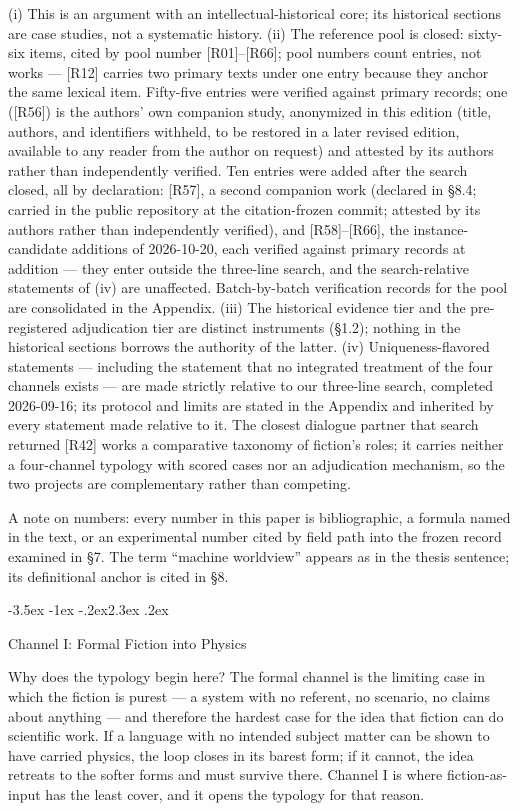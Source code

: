 \documentclass[11pt,a4paper]{article}
\makeatletter
\renewcommand\section{\@startsection{section}{1}{\z@}%
  {-3.5ex \@plus -1ex \@minus -.2ex}{2.3ex \@plus .2ex}%
  {\normalfont\Large\bfseries\raggedright}}
\makeatother
\begin{document}
(i) This is an argument with an intellectual-historical core; its historical sections are case studies, not a systematic history. (ii) The reference pool is closed: sixty-six items, cited by pool number [R01]–[R66]; pool numbers count entries, not works — [R12] carries two primary texts under one entry because they anchor the same lexical item. Fifty-five entries were verified against primary records; one ([R56]) is the authors' own companion study, anonymized in this edition (title, authors, and identifiers withheld, to be restored in a later revised edition, available to any reader from the author on request) and attested by its authors rather than independently verified. Ten entries were added after the search closed, all by declaration: [R57], a second companion work (declared in §8.4; carried in the public repository at the citation-frozen commit; attested by its authors rather than independently verified), and [R58]–[R66], the instance-candidate additions of 2026-10-20, each verified against primary records at addition — they enter outside the three-line search, and the search-relative statements of (iv) are unaffected. Batch-by-batch verification records for the pool are consolidated in the Appendix. (iii) The historical evidence tier and the pre-registered adjudication tier are distinct instruments (§1.2); nothing in the historical sections borrows the authority of the latter. (iv) Uniqueness-flavored statements — including the statement that no integrated treatment of the four channels exists — are made strictly relative to our three-line search, completed 2026-09-16; its protocol and limits are stated in the Appendix and inherited by every statement made relative to it. The closest dialogue partner that search returned [R42] works a comparative taxonomy of fiction's roles; it carries neither a four-channel typology with scored cases nor an adjudication mechanism, so the two projects are complementary rather than competing.

A note on numbers: every number in this paper is bibliographic, a formula named in the text, or an experimental number cited by field path into the frozen record examined in §7. The term ``machine worldview'' appears as in the thesis sentence; its definitional anchor is cited in §8.

\section{Channel I: Formal Fiction into Physics}

Why does the typology begin here? The formal channel is the limiting case in which the fiction is purest --- a system with no referent, no scenario, no claims about anything --- and therefore the hardest case for the idea that fiction can do scientific work. If a language with no intended subject matter can be shown to have carried physics, the loop closes in its barest form; if it cannot, the idea retreats to the softer forms and must survive there. Channel I is where fiction-as-input has the least cover, and it opens the typology for that reason.
\end{document}
